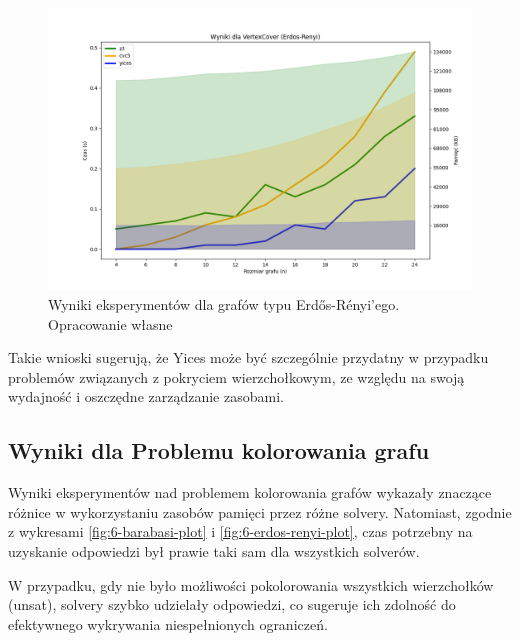 \begin{figure}[htbp]
	\centering
	\begin{minipage}{\textwidth}
		\includegraphics[width=\textwidth]{./figures/5-erdos-renyi-plot.png}
		\caption{Wyniki eksperymentów dla grafów typu Erdős-Rényi'ego. Opracowanie własne}
		\label{fig:5-erdos-renyi-plot}
	\end{minipage}
\end{figure}

Takie wnioski sugerują, że Yices może być szczególnie przydatny w przypadku problemów związanych z pokryciem wierzchołkowym, ze względu na swoją wydajność i oszczędne zarządzanie zasobami. 

\subsection{Wyniki dla Problemu kolorowania grafu}

Wyniki eksperymentów nad problemem kolorowania grafów wykazały znaczące różnice w wykorzystaniu zasobów pamięci przez różne solvery. Natomiast, zgodnie z wykresami \ref{fig:6-barabasi-plot} i \ref{fig:6-erdos-renyi-plot}, czas potrzebny na uzyskanie odpowiedzi był prawie taki sam dla wszystkich solverów. 

W przypadku, gdy nie było możliwości pokolorowania wszystkich wierzchołków (unsat), solvery szybko udzielały odpowiedzi, co sugeruje ich zdolność do efektywnego wykrywania niespełnionych ograniczeń.

